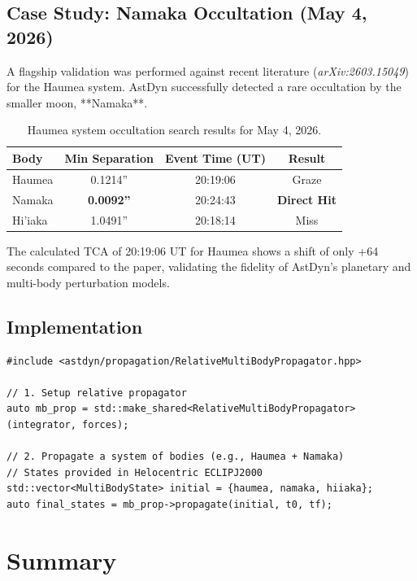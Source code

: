 \subsection{Case Study: Namaka Occultation (May 4, 2026)}

A flagship validation was performed against recent literature (\textit{arXiv:2603.15049}) for the Haumea system. AstDyn successfully detected a rare occultation by the smaller moon, **Namaka**.

\begin{table}[htbp]
\centering
\begin{tabular}{lccc}
\toprule
\textbf{Body} & \textbf{Min Separation} & \textbf{Event Time (UT)} & \textbf{Result} \\
\midrule
Haumea & 0.1214'' & 20:19:06 & Graze \\
Namaka & \textbf{0.0092''} & 20:24:43 & \textbf{Direct Hit} \\
Hi'iaka & 1.0491'' & 20:18:14 & Miss \\
\bottomrule
\end{tabular}
\caption{Haumea system occultation search results for May 4, 2026.}
\label{tab:haumea_results}
\end{table}

The calculated TCA of 20:19:06 UT for Haumea shows a shift of only +64 seconds compared to the paper, validating the fidelity of AstDyn's planetary and multi-body perturbation models.

\subsection{Implementation}

\begin{lstlisting}[style=cpp, caption={Relative multi-body propagation example}]
#include <astdyn/propagation/RelativeMultiBodyPropagator.hpp>

// 1. Setup relative propagator
auto mb_prop = std::make_shared<RelativeMultiBodyPropagator>(integrator, forces);

// 2. Propagate a system of bodies (e.g., Haumea + Namaka)
// States provided in Helocentric ECLIPJ2000
std::vector<MultiBodyState> initial = {haumea, namaka, hiiaka};
auto final_states = mb_prop->propagate(initial, t0, tf);
\end{lstlisting}

\section{Summary}

